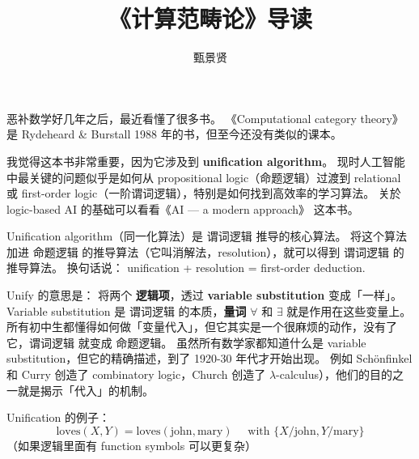 \documentclass[12pt, orivec]{article}
\title{《计算范畴论》导读}
\author{甄景贤}
\begin{document}
\setlength{\parindent}{0pt}
\setlength{\parskip}{2.8ex plus0.8ex minus0.8ex}

\maketitle

恶补数学好几年之后，最近看懂了很多书。 《Computational category theory》 
是 Rydeheard \& Burstall 1988 年的书，但至今还没有类似的课本。  

我觉得这本书非常重要，因为它涉及到 \textbf{unification algorithm}。  现时人工智能中最关键的问题似乎是如何从 propositional logic（命题逻辑）过渡到 relational 或 first-order logic（一阶谓词逻辑），特别是如何找到高效率的学习算法。  关於 logic-based AI 的基础可以看看《AI --- a modern approach》 这本书。  

Unification algorithm（同一化算法）是 谓词逻辑 推导的核心算法。  将这个算法加进 命题逻辑 的推导算法（它叫消解法，resolution），就可以得到 谓词逻辑 的推导算法。  换句话说： unification + resolution = first-order deduction.

Unify 的意思是： 将两个 \textbf{逻辑项}，透过 \textbf{variable substitution} 变成「一样」。  Variable substitution 是 谓词逻辑 的本质，\textbf{量词} $\forall$ 和 $\exists$ 就是作用在这些变量上。  所有初中生都懂得如何做「变量代入」，但它其实是一个很麻烦的动作，没有了它，谓词逻辑 就变成 命题逻辑。  虽然所有数学家都知道什么是 variable substitution，但它的精确描述，到了 1920-30 年代才开始出现。 例如 Sch\"{o}nfinkel 和 Curry 创造了 combinatory logic，Church 创造了 $\lambda$-calculus），他们的目的之一就是揭示「代入」的机制。 

Unification 的例子：
\begin{equation}
\mbox{loves}(X,Y) = \mbox{loves}(\mbox{john}, \mbox{mary}) \quad \mbox{ with } \{ X/\mbox{john}, Y/\mbox{mary} \}
\end{equation}
（如果逻辑里面有 function symbols 可以更复杂）
\end{document}
